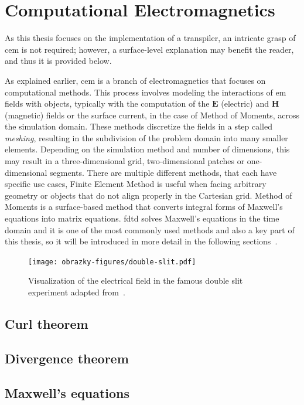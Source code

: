 \section{Computational Electromagnetics}\label{sec:cem}
As this thesis focuses on the implementation of a transpiler, an intricate grasp of \gls{cem} is not required; however, a surface-level explanation may benefit the reader, and thus it is provided below.

As explained earlier, \gls{cem} is a branch of electromagnetics that focuses on computational methods. This process involves modeling the interactions of \gls{em} fields with objects, typically with the computation of the $\mathbf{E}$ (electric) and $\mathbf{H}$ (magnetic) fields or the surface current, in the case of Method of Moments, across the simulation domain. These methods discretize the fields in a step called \emph{meshing}, resulting in the subdivision of the problem domain into many smaller elements. Depending on the simulation method and number of dimensions, this may result in a three-dimensional grid, two-dimensional patches or one-dimensional segments. There are multiple different methods, that each have specific use cases, Finite Element Method is useful when facing arbitrary geometry or objects that do not align properly in the Cartesian grid. Method of Moments is a surface-based method that converts integral forms of Maxwell's equations into matrix equations. \gls{fdtd} solves Maxwell's equations in the time domain and it is one of the most commonly used methods and also a key part of this thesis, so it will be introduced in more detail in the following sections~\cite{davidson_2010}.


\begin{figure}[H]\label{fig:double-slit}
  \centering
  \texttt{[image: obrazky-figures/double-slit.pdf]}
  \caption{Visualization of the electrical field in the famous double slit experiment adapted from~\cite{taylor_meep_double_slit}.}
\end{figure}




\subsection*{Curl theorem}
\subsection*{Divergence theorem}
\subsection*{Maxwell's equations}

